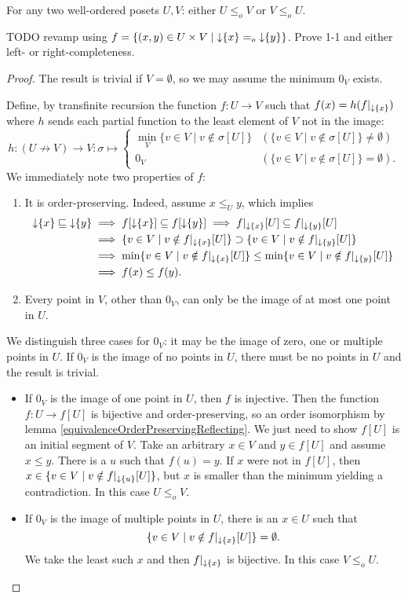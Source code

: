 \begin{theorem}\label{comparabilityWosets}
For any two well-ordered posets $U,V$: either $U\leq_o V$ or $V\leq_o U$.
\end{theorem}
TODO revamp using $f = \setbuilder{(x,y)\in U\times V}{\downset\{x\} =_o \downset\{y\}}$. Prove 1-1 and either left- or right-completeness.
\begin{proof}
The result is trivial if $V=\emptyset$, so we may assume the minimum $0_V$ exists.

Define, by transfinite recursion the function $f:U\to V$ such that $f(x) = h(f|_{\operatorname{\downarrow}\{x\}})$ where $h$ sends each partial function to the least element of $V$ not in the image:
\[ h: (U\not\to V) \to V: \sigma \mapsto \begin{cases}
\min_V\{v\in V\;|\; v\notin \sigma[U]\} & (\{v\in V\;|\; v\notin \sigma[U]\} \neq \emptyset) \\
0_V  & (\{v\in V\;|\; v\notin \sigma[U]\} = \emptyset).
\end{cases} \]
We immediately note two properties of $f$:
\begin{enumerate}
\item It is order-preserving. Indeed, assume $x\leq_U y$, which implies
\begin{align*}
\operatorname{\downarrow}\{x\} \sqsubseteq \operatorname{\downarrow}\{y\} &\implies f[\operatorname{\downarrow}\{x\}] \subseteq f[\operatorname{\downarrow}\{y\}] \implies f|_{\operatorname{\downarrow}\{x\}}[U] \subseteq f|_{\operatorname{\downarrow}\{y\}}[U] \\
&\implies \{v\in V\;|\; v\notin f|_{\operatorname{\downarrow}\{x\}}[U]\} \supset \{v\in V\;|\; v\notin f|_{\operatorname{\downarrow}\{y\}}[U]\} \\
&\implies \min\{v\in V\;|\; v\notin f|_{\operatorname{\downarrow}\{x\}}[U]\} \leq \min\{v\in V\;|\; v\notin f|_{\operatorname{\downarrow}\{y\}}[U]\} \\ &\implies f(x) \leq f(y).
\end{align*}
\item Every point in $V$, other than $0_V$, can only be the image of at most one point in $U$.
\end{enumerate}
We distinguish three cases for $0_V$: it may be the image of zero, one or multiple points in $U$. If $0_V$ is the image of no points in $U$, there must be no points in $U$ and the result is trivial.
\begin{itemize}
\item If $0_V$ is the image of one point in $U$, then $f$ is injective. Then the function $f: U\to f[U]$ is bijective and order-preserving, so an order isomorphism by lemma \ref{equivalenceOrderPreservingReflecting}. We just need to show $f[U]$ is an initial segment of $V$. Take an arbitrary $x\in V$ and $y\in f[U]$ and assume $x\leq y$. There is a $u$ such that $f(u) = y$. If $x$ were not in $f[U]$, then $x\in\{v\in V\;|\; v\notin f|_{\operatorname{\downarrow}\{u\}}[U]\}$, but $x$ is smaller than the minimum yielding a contradiction. In this case $U\leq_o V$.
\item If $0_V$ is the image of multiple points in $U$, there is an $x\in U$ such that
\[ \{v\in V\;|\; v\notin f|_{\operatorname{\downarrow}\{x\}}[U]\} = \emptyset. \]
We take the least such $x$ and then $f|_{\operatorname{\downarrow}\{x\}}$ is bijective. In this case $V \leq_o U$.
\end{itemize}
\end{proof}
